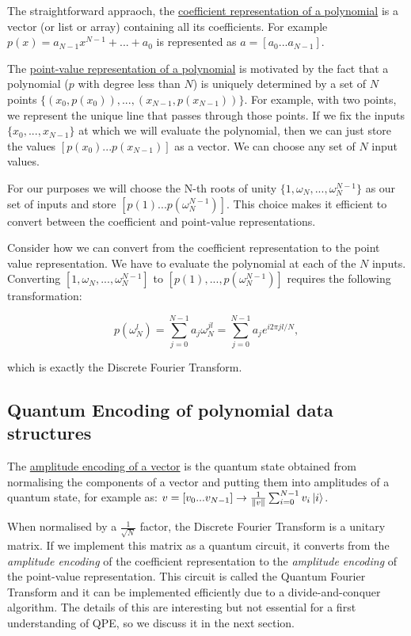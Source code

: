 \documentclass[12pt, a4paper]{article}
\begin{document}
	The straightforward appraoch, the \underline{coefficient representation of a polynomial} \cite{cormen2009algorithms_ch30} is a vector (or list or array) containing all its coefficients. For example $p(x) = a_{N-1}x^{N-1} + ... + a_0$ is represented as $a = [a_0 ... a_{N-1}]$. 
	
	The \underline{point-value representation of a polynomial} \cite{cormen2009algorithms_ch30} is motivated by the fact that a polynomial ($p$ with degree less than $N$) is uniquely determined by a set of $N$ points $\{(x_0,p(x_0)), ..., (x_{N-1},p(x_{N-1}))\}$. For example, with two points, we represent the unique line that passes through those points. If we fix the inputs $\{x_0, ..., x_{N-1}\}$ at which we will evaluate the polynomial, then we can just store the values $[p(x_0)...p(x_{N-1})]$ as a vector. We can choose any set of $N$ input values.
	
	
	For our purposes we will choose the N-th roots of unity $\{1,\omega_N, ..., \omega_N^{N-1}\}$ as our set of inputs and store $[p(1)...p(\omega_N^{N-1})]$. This choice makes it efficient to convert between the coefficient and point-value representations. 
	

	Consider how we can convert from the coefficient representation to the point value representation. We have to evaluate the polynomial at each of the $N$ inputs. Converting $[1,\omega_N, ..., \omega_N^{N-1}]$ to  $[p(1),...,p(\omega_N^{N-1})]$ requires the following transformation:
	
	$$p(\omega_N^l) = \sum_{j=0}^{N-1} a_j \omega_N^{jl} = \sum_{j=0}^{N-1} a_j e^{i2\pi jl/N},$$
	
	which is exactly the Discrete Fourier Transform. 
	
	
	\subsection{Quantum Encoding of polynomial data structures}
	
	The \underline{amplitude encoding of a vector} is the quantum state obtained from normalising the components of a vector and putting them into amplitudes of a quantum state, for example as: $v= [v_0 ... v_{N-1}] \rightarrow \frac{1}{\norm{v}} \sum_{i=0}^{N-1} v_i \ket{i}$.
	
	When normalised by a $\frac{1}{\sqrt{N}}$ factor, the Discrete Fourier Transform is a unitary matrix. If we implement this matrix as a quantum circuit, it converts from the \textit{amplitude encoding} of the coefficient representation to the \textit{amplitude encoding} of the point-value representation. This circuit is called the Quantum Fourier Transform and it can be implemented efficiently due to a divide-and-conquer algorithm. The details of this are interesting but not essential for a first understanding of QPE, so we discuss it in the next section.
	
\end{document}
